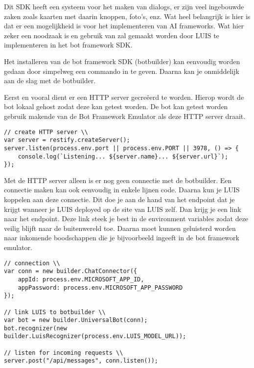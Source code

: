 Dit SDK heeft een systeem voor het maken van dialogs, er zijn veel ingebouwde zaken zoals kaarten met daarin knoppen, foto's, enz. Wat heel belangrijk is hier is dat er een mogelijkheid is voor het implementeren van AI frameworks. Wat hier zeker een noodzaak is en gebruik van zal gemaakt worden door LUIS te implementeren in het bot framework SDK.

Het installeren van de bot framework SDK (botbuilder) kan eenvoudig worden gedaan door simpelweg een commando in te geven. Daarna kan je onmiddelijk aan de slag met de botbuilder.

Eerst en vooral dient er een HTTP server gecreëerd te worden. Hierop wordt de bot lokaal gehost zodat deze kan getest worden. De bot kan getest worden gebruik makende van de Bot Framework Emulator als deze HTTP server draait.

\medskip
\begin{lstlisting}[caption=creatie van de HTTP server]
// create HTTP server \\
var server = restify.createServer();
server.listen(process.env.port || process.env.PORT || 3978, () => {
	console.log(`Listening... ${server.name}... ${server.url}`);
});
\end{lstlisting}

Met de HTTP server alleen is er nog geen connectie met de botbuilder. Een connectie maken kan ook eenvoudig in enkele lijnen code. Daarna kun je LUIS koppelen aan deze connectie. Dit doe je aan de hand van het endpoint dat je krijgt wanneer je LUIS deployed op de site van LUIS zelf. Dan krijg je een link naar het endpoint. Deze link steek je best in de environment variables zodat deze veilig blijft naar de buitenwereld toe. Daarna moet kunnen geluisterd worden naar inkomende boodschappen die je bijvoorbeeld ingeeft in de bot framework emulator. 

\medskip
\begin{lstlisting}[caption=connectie en linken van LUIS]
// connection \\
var conn = new builder.ChatConnector({
	appId: process.env.MICROSOFT_APP_ID,
	appPassword: process.env.MICROSOFT_APP_PASSWORD
});

// link LUIS to botbuilder \\
var bot = new builder.UniversalBot(conn);
bot.recognizer(new builder.LuisRecognizer(process.env.LUIS_MODEL_URL));

// listen for incoming requests \\
server.post("/api/messages", conn.listen());
\end{lstlisting}

